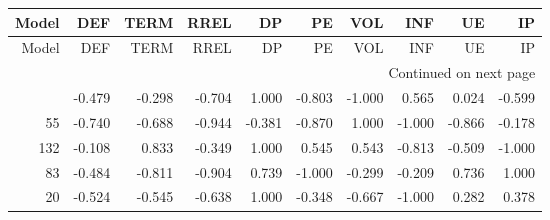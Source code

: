 \begin{longtable}{rrrrrrrrrr}
\label{tab:SSD_loss_standardised_5}\\
\toprule
 Model &    DEF &   TERM &   RREL &     DP &     PE &    VOL &    INF &     UE &     IP \\
\midrule
\endfirsthead

\toprule
 Model &    DEF &   TERM &   RREL &     DP &     PE &    VOL &    INF &     UE &     IP \\
\midrule
\endhead
\midrule
\multicolumn{10}{r}{{Continued on next page}} \\
\midrule
\endfoot

\bottomrule
\endlastfoot
    23 & -0.479 & -0.298 & -0.704 &  1.000 & -0.803 & -1.000 &  0.565 &  0.024 & -0.599 \\
    55 & -0.740 & -0.688 & -0.944 & -0.381 & -0.870 &  1.000 & -1.000 & -0.866 & -0.178 \\
   132 & -0.108 &  0.833 & -0.349 &  1.000 &  0.545 &  0.543 & -0.813 & -0.509 & -1.000 \\
    83 & -0.484 & -0.811 & -0.904 &  0.739 & -1.000 & -0.299 & -0.209 &  0.736 &  1.000 \\
    20 & -0.524 & -0.545 & -0.638 &  1.000 & -0.348 & -0.667 & -1.000 &  0.282 &  0.378 \\
\end{longtable}
